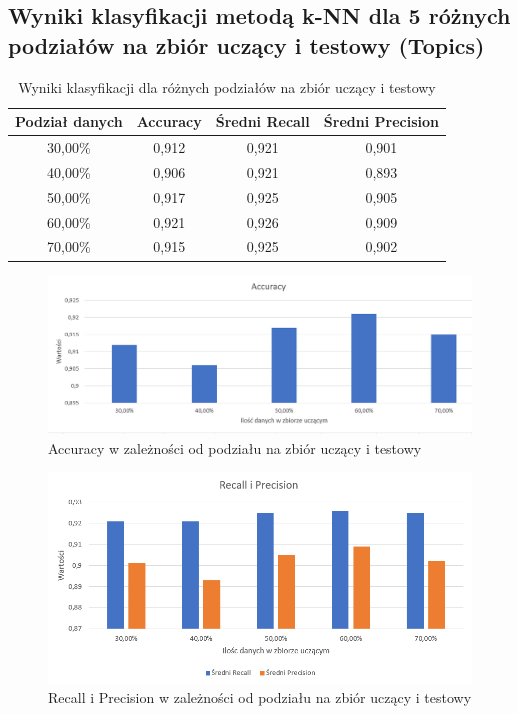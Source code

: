 \documentclass{classrep}
\begin{document}
{\subsection{Wyniki klasyfikacji metodą k-NN dla 5 różnych podziałów na zbiór uczący i testowy (Topics)}

\begin{table}[h]
\begin{center}
\caption{Wyniki klasyfikacji dla różnych podziałów na zbiór uczący i testowy}
\begin{tabular}{|c|c|c|c|}
\hline
\textbf{Podział danych} & \textbf{Accuracy} & \textbf{Średni Recall} & \textbf{Średni Precision} \\ \hline
30,00\%                 & 0,912             & 0,921                  & 0,901                     \\ \hline
40,00\%                 & 0,906             & 0,921                  & 0,893                     \\ \hline
50,00\%                 & 0,917             & 0,925                  & 0,905                     \\ \hline
60,00\%                 & 0,921             & 0,926                  & 0,909                     \\ \hline
70,00\%                 & 0,915             & 0,925                  & 0,902                     \\ \hline
\end{tabular}
\end{center}
\end{table}


\begin{figure}[H]
\caption{Accuracy w zależności od podziału na zbiór uczący i testowy}
\centering
\includegraphics[width=1\textwidth]{i11}
\end{figure}

\begin{figure}[H]
\caption{Recall i Precision w zależności od podziału na zbiór uczący i testowy}
\centering
\includegraphics[width=1\textwidth]{i12}
\end{figure}

}
\end{document}
